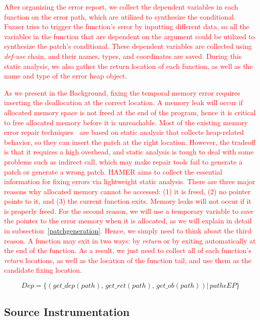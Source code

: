 \documentclass[a4j,dvipdfmx]{article}
\begin{document}
\textcolor{red}{
After organizing the error report, we collect the dependent variables in each function on the error path, which are utilized to synthesize the conditional. Fuzzer tries to trigger the function's error by inputting different data, so all the variables in the function that are dependent on the argument could be utilized to synthesize the patch's conditional. These dependent variables are collected using {\it def-use} chain, and their names, types, and coordinates are saved. During this static analysis, we also gather the return location of each function, as well as the name and type of the error heap object.
}

\textcolor{red}{
As we present in the Background, fixing the temporal memory error requires inserting the deallocation at the correct location. A memory leak will occur if allocated memory space is not freed at the end of the program, hence it is critical to free allocated memory before it is unreachable. Most of the existing memory error repair techniques~\cite{SAVER,Memfix} are based on static analysis that collects heap-related behavior, so they can insert the patch at the right location. However, the tradeoff is that it requires a high overhead, and static analysis is tough to deal with some problems such as indirect call, which may make repair tools fail to generate a patch or generate a wrong patch. HAMER aims to collect the essential information for fixing errors via lightweight static analysis. There are three major reasons why allocated memory cannot be accessed: (1) it is freed, (2) no pointer points to it, and (3) the current function exits. Memory leaks will not occur if it is properly freed. For the second reason, we will use a temporary variable to save the pointer to the error memory when it is allocated, as we will explain in detail in subsection~\ref{patchgeneration}. Hence,  we simply need to think about the third reason. A function may exit in two ways: by {\it return} or by exiting automatically at the end of the function. As a result, we just need to collect all of each function's {\it return} locations, as well as the location of the function tail, and use them as the candidate fixing location.
}

\begin{equation}
Dep=\{(get\_dep(path),\,get\_ret(path),\,get\_ob(path))|\, path \epsilon EP\}
\end{equation}

\subsection{Source Instrumentation}
\end{document}
